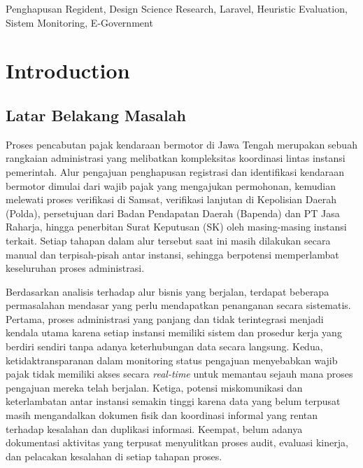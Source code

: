 \documentclass[conference]{IEEEtran}
\begin{document}
\begin{abstract}
\textbf{Kesimpulan} --- Platform SIP-HAPUS berhasil mengintegrasikan
proses bisnis pencabutan pajak kendaraan bermotor ke dalam sistem digital
yang transparan, \emph{real-time}, dan aman. Seluruh luaran yang ditargetkan
dalam program Hibah Internal PkM Universitas Bina Nusantara, yaitu publikasi
Scopus, poster ilmiah, \emph{enrichment} pengajaran, dan teknologi/inovasi,
berada dalam tahap pengerjaan sesuai dengan \emph{roadmap} yang telah
ditetapkan.

\textbf{Kata Kunci}: Penghapusan Regident, Design Science Research,
Laravel, Heuristic Evaluation, Sistem Monitoring, E-Government
\end{abstract}

\begin{IEEEkeywords}
Penghapusan Regident, Design Science Research, Laravel, Heuristic Evaluation,
Sistem Monitoring, E-Government
\end{IEEEkeywords}

\section{Introduction}
\label{sec:introduction}

\subsection{Latar Belakang Masalah}
\label{subsec:latar-belakang}

Proses pencabutan pajak kendaraan bermotor di Jawa Tengah merupakan sebuah
rangkaian administrasi yang melibatkan kompleksitas koordinasi lintas instansi
pemerintah. Alur pengajuan penghapusan registrasi dan identifikasi kendaraan
bermotor dimulai dari wajib pajak yang mengajukan permohonan, kemudian melewati
proses verifikasi di Samsat, verifikasi lanjutan di Kepolisian Daerah (Polda),
persetujuan dari Badan Pendapatan Daerah (Bapenda) dan PT Jasa Raharja, hingga
penerbitan Surat Keputusan (SK) oleh masing-masing instansi terkait. Setiap
tahapan dalam alur tersebut saat ini masih dilakukan secara manual dan
terpisah-pisah antar instansi, sehingga berpotensi memperlambat keseluruhan
proses administrasi.

Berdasarkan analisis terhadap alur bisnis yang berjalan, terdapat beberapa
permasalahan mendasar yang perlu mendapatkan penanganan secara sistematis.
Pertama, proses administrasi yang panjang dan tidak terintegrasi menjadi kendala
utama karena setiap instansi memiliki sistem dan prosedur kerja yang berdiri
sendiri tanpa adanya keterhubungan data secara langsung. Kedua,
ketidaktransparanan dalam monitoring status pengajuan menyebabkan wajib pajak
tidak memiliki akses secara \emph{real-time} untuk memantau sejauh mana proses
pengajuan mereka telah berjalan. Ketiga, potensi miskomunikasi dan keterlambatan
antar instansi semakin tinggi karena data yang belum terpusat masih mengandalkan
dokumen fisik dan koordinasi informal yang rentan terhadap kesalahan dan duplikasi
informasi. Keempat, belum adanya dokumentasi aktivitas yang terpusat menyulitkan
proses audit, evaluasi kinerja, dan pelacakan kesalahan di setiap tahapan proses.
\end{document}

